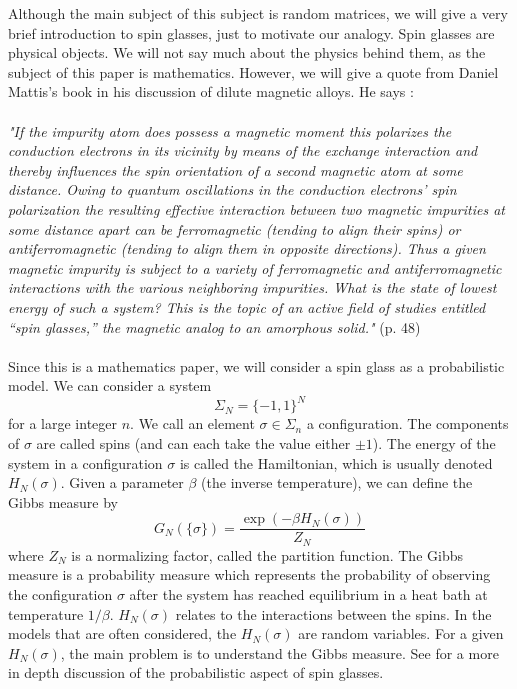 \documentclass[12pt]{report}
\theoremstyle{definition}
\begin{document}
Although the main subject of this subject is random matrices, we will give a very brief introduction to spin glasses, just to motivate our analogy.  Spin glasses are physical objects.  We will not say much about the physics behind them, as the subject of this paper is mathematics.  However, we will give a quote from Daniel Mattis's book \cite{Mattis} in his discussion of dilute magnetic alloys.  He says :
\\ \\
{\em "If the impurity atom does possess a magnetic moment this polarizes the
conduction electrons in its vicinity by means of the exchange interaction and
thereby influences the spin orientation of a second magnetic atom at some
distance. Owing to quantum oscillations in the conduction electrons’ spin polarization
the resulting effective interaction between two magnetic impurities
at some distance apart can be ferromagnetic (tending to align their spins)
or antiferromagnetic (tending to align them in opposite directions). Thus a
given magnetic impurity is subject to a variety of ferromagnetic and antiferromagnetic
interactions with the various neighboring impurities. What is
the state of lowest energy of such a system? This is the topic of an active
field of studies entitled “spin glasses,” the magnetic analog to an amorphous
solid."} \cite{Mattis} (p. 48)
\\ \\
Since this is a mathematics paper, we will consider a spin glass as a probabilistic model.  We can consider a system
$$
\Sigma_N=\{-1,1\}^N
$$
for a large integer $n$.  We call an element $\sigma\in \Sigma_n$ a configuration.  The components of $\sigma$ are called spins (and can each take the value either $\pm 1$).  The energy of the system in a configuration $\sigma$ is called the Hamiltonian, which is usually denoted $H_N(\sigma)$.  Given a parameter $\beta$ (the inverse temperature), we can define the Gibbs measure by 
$$
G_N(\{\sigma\})=\frac{\exp(-\beta H_N(\sigma))}{Z_N}
$$
where $Z_N$ is a normalizing factor, called the partition function.  The Gibbs measure is a probability measure which represents the probability of observing the configuration $\sigma$ after the system has reached equilibrium in a heat bath at temperature $1/\beta$.  $H_N(\sigma)$ relates to the interactions between the spins.  In the models that are often considered, the $H_N(\sigma)$ are random variables.  For a given $H_N(\sigma)$, the main problem is to understand the Gibbs measure.  See \cite{Talagrandbook} for a more in depth discussion of the probabilistic aspect of spin glasses.  
\end{document}
